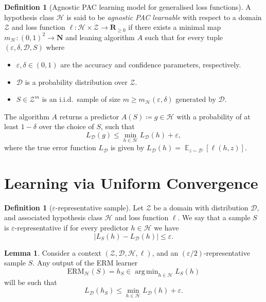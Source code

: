 \documentclass[11pt, reqno]{amsart}
\theoremstyle{definition}
\newtheorem{lemma}[theorem]{Lemma}
\newtheorem{definition}[theorem]{Definition}
\renewcommand{\leq}{\leqslant}
\renewcommand{\geq}{\geqslant}
\newcommand{\N}{\mathbf{N}}
\newcommand{\R}{\mathbf{R}}
\DeclareMathOperator{\Expect}{\mathbb{E}} %
\DeclareMathOperator*{\argmin}{arg\,min}
\begin{document}
\begin{definition}[Agnostic PAC learning model for generalised loss functions]
\label{def:agnostic-pac-learning-model-loss-function}
A hypothesis class \(\mathcal{H}\) is said to be \emph{agnostic PAC learnable}
with respect to a domain \(\mathcal{Z}\) and loss function
\(\ell: \mathcal{H} \times \mathcal{Z} \to \R_{\geq 0}\) if there exists a
minimal map \(m_{\mathcal{H}}: (0, 1)^2 \to \N\) and leaning algorithm \(A\)
such that for every tuple \((\varepsilon, \delta, \mathcal{D}, S)\) where
\begin{itemize}\setlength\itemsep{0em}
\item \(\varepsilon, \delta \in (0, 1)\) are the accuracy and confidence
  parameters, respectively.
\item \(\mathcal{D}\) is a probability distribution over
  \(\mathcal{Z}\).
\item \(S \in \mathcal{Z}^m\) is an i.i.d.~sample of size
  \(m \geq m_{\mathcal{H}}(\varepsilon, \delta)\) generated by \(\mathcal{D}\).
\end{itemize}
The algorithm \(A\) returns a predictor \(A(S) \coloneq g \in \mathcal{H}\) with
a probability of at least \(1 - \delta\) over the choice of \(S\), such that
\[
L_{\mathcal{D}}(g) \leq \min_{h \in \mathcal{H}} L_{\mathcal{D}}(h) + \varepsilon,
\]
where the true error function \(L_{\mathcal{D}}\) is given by
\(L_{\mathcal{D}}(h) = \Expect_{z \sim \mathcal{D}}[\ell(h, z)]\).
\end{definition}

\section{Learning via Uniform Convergence}

\begin{definition}[\(\varepsilon\)-representative sample]
\label{def:epsilon-representative-sample}
Let \(\mathcal{Z}\) be a domain with distribution \(\mathcal{D}\), and
associated hypothesis class \(\mathcal{H}\) and loss function \(\ell\). We say
that a sample \(S\) is \(\varepsilon\)-representative if for every predictor \(h
\in \mathcal{H}\) we have
\[
|L_S(h) - L_{\mathcal{D}}(h)| \leq \varepsilon.
\]
\end{definition}

\begin{lemma}
\label{lem:epsilon-representative-good-erm-output}
Consider a context \((\mathcal{Z}, \mathcal{D}, \mathcal{H}, \ell)\), and an
\((\varepsilon/2)\)-representative sample \(S\). Any output of the ERM learner
\[
\text{ERM}_{\mathcal{H}}(S) = h_S \in \argmin_{h \in \mathcal{H}} L_S(h)
\]
will be such that
\[
L_{\mathcal{D}}(h_S) \leq \min_{h \in \mathcal{H}} L_{\mathcal{D}}(h) + \varepsilon.
\]
\end{lemma}
\end{document}
